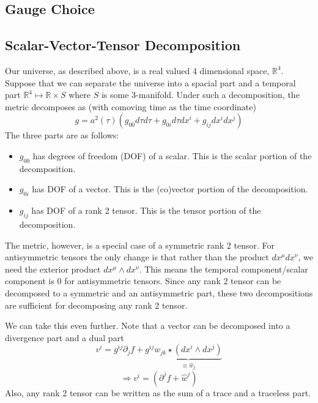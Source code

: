 \subsection{Gauge Choice}
\subsection{Scalar-Vector-Tensor Decomposition}

Our universe, as described above, is a real valued 4 dimensional space, $\mathbb{R}^4$. Suppose that we can separate the universe into a spacial part and a temporal part $\mathbb{R}^4 \mapsto \mathbb{R} \times S$ where $S$ is some $3$-manifold. Under such a decomposition, the metric decomposes as (with comoving time as the time coordinate)
\begin{equation}
	g = a^2(\tau)\left( g_{00}d\tau d\tau + g_{0i}d\tau dx^{i} + g_{ij} dx^{i}dx^{j} \right)
\end{equation}
The three parts are as follows:
\begin{itemize}
    \item $g_{00}$ has degrees of freedom (DOF) of a scalar. This is the scalar portion of the decomposition.
    \item $g_{0i}$ has DOF of a vector. This is the (co)vector portion of the decomposition.
    \item $g_{ij}$ has DOF of a rank 2 tensor. This is the tensor portion of the decomposition.
\end{itemize}
The metric, however, is a special case of a symmetric rank 2 tensor. For antisymmetric tensors the only change is that rather than the product $dx^\mu dx^\nu$, we need the exterior product $dx^\mu \wedge dx^\nu$. This means the temporal component/scalar component is 0 for antisymmetric tensors. Since any rank 2 tensor can be decomposed to a symmetric and an antisymmetric part, these two decompositions are sufficient for decomposing any rank 2 tensor. 

We can take this even further. Note that a vector can be decomposed into a divergence part and a dual part
\begin{equation} 
	v^i = g^{ij}\partial_j f + g^{ij} \underbrace{w_{jk}\star (dx^{i} \wedge dx^{j})}_{\equiv \hat{w}_j}
\end{equation}
\begin{equation}
	\Rightarrow v^i = (\partial^j f + \hat{w}^j)
\end{equation}
Also, any rank 2 tensor can be written as the sum of a trace and a traceless part.